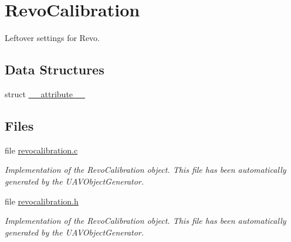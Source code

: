 \hypertarget{group___revo_calibration}{\section{\-Revo\-Calibration}
\label{group___revo_calibration}
}


\-Leftover settings for \-Revo.  


\subsection*{\-Data \-Structures}
\begin{DoxyCompactItemize}
\item 
struct \hyperlink{struct____attribute____}{\-\_\-\-\_\-attribute\-\_\-\-\_\-}
\end{DoxyCompactItemize}
\subsection*{\-Files}
\begin{DoxyCompactItemize}
\item 
file \hyperlink{revocalibration_8c}{revocalibration.\-c}
\begin{DoxyCompactList}\small\item\em \-Implementation of the \-Revo\-Calibration object. \-This file has been automatically generated by the \-U\-A\-V\-Object\-Generator. \end{DoxyCompactList}\item 
file \hyperlink{revocalibration_8h}{revocalibration.\-h}
\begin{DoxyCompactList}\small\item\em \-Implementation of the \-Revo\-Calibration object. \-This file has been automatically generated by the \-U\-A\-V\-Object\-Generator. \end{DoxyCompactList}\end{DoxyCompactItemize}
